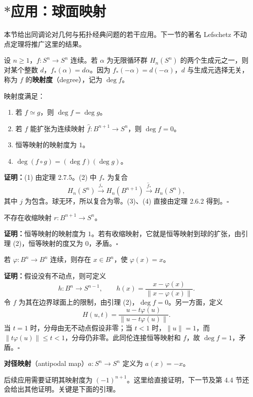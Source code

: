 \section{\texorpdfstring{$*$}{*}应用：球面映射}
本节给出同调论对几何与拓扑经典问题的若干应用。下一节的著名 Lefschetz 不动点定理将推广这里的结果。

设 $n\geq1$，$f:S^n\to S^n$ 连续。若 $\alpha$ 为无限循环群 $H_n(S^n)$ 的两个生成元之一，则对某个整数 $d$，$f_*(\alpha)=d\alpha$。因为 $f_*(-\alpha)=d(-\alpha)$，$d$ 与生成元选择无关，称为 $f$ 的\textbf{映射度}（degree），记为 $\deg f$。

映射度满足：
\begin{enumerate}[label=(\arabic*)]
\item 若 $f\simeq g$，则 $\deg f=\deg g$。
\item 若 $f$ 能扩张为连续映射 $\widehat f:B^{n+1}\to S^n$，则 $\deg f=0$。
\item 恒等映射的映射度为 $1$。
\item $\deg(f\circ g)=(\deg f)(\deg g)$。
\end{enumerate}
\noindent\textbf{证明：}(1) 由定理 2.7.5。(2) 中 $f_*$ 为复合
\[
H_n(S^n)\xrightarrow{j_*}H_n(B^{n+1})\xrightarrow{\widehat f_*}H_n(S^n),
\]
其中 $j$ 为包含。球无环，所以复合为零。(3)、(4) 直接由定理 2.6.2 得到。\hfill$\square$

不存在收缩映射 $r:B^{n+1}\to S^n$。

\noindent\textbf{证明：}恒等映射的映射度为 $1$。若有收缩映射，它就是恒等映射到球的扩张，由引理 (2)，恒等映射的度又为 $0$，矛盾。\hfill$\square$

若 $\varphi:B^n\to B^n$ 连续，则存在 $x\in B^n$，使 $\varphi(x)=x$。

\noindent\textbf{证明：}假设没有不动点，则可定义
\[
h:B^n\to S^{n-1},\qquad h(x)=\frac{x-\varphi(x)}{\|x-\varphi(x)\|}.
\]
令 $f$ 为其在边界球面上的限制，由引理 (2)，$\deg f=0$。另一方面，定义
\[
H(u,t)=\frac{u-t\varphi(u)}{\|u-t\varphi(u)\|}.
\]
当 $t=1$ 时，分母由无不动点假设非零；当 $t<1$ 时，$\|u\|=1$，而 $\|t\varphi(u)\|\leq t<1$，分母仍非零。此同伦连接恒等映射和 $f$，故 $\deg f=1$，矛盾。\hfill$\square$

\textbf{对径映射}（antipodal map）$a:S^n\to S^n$ 定义为 $a(x)=-x$。

后续应用需要证明其映射度为 $(-1)^{n+1}$。这里给直接证明，下一节及第 4.4 节还会给出其他证明。关键是下面的引理。

